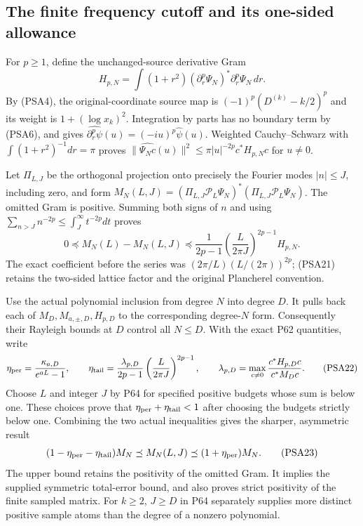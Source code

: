 \documentclass{article}
\begin{document}
\subsection{The finite frequency cutoff and its one-sided allowance}

For $p\ge1$, define the unchanged-source derivative Gram
\[
 H_{p,N}=\int(1+r^2)(\partial_r^p\Psi_N)^*
                            \partial_r^p\Psi_N\,dr.
 \tag{PSA20}
\]
By (PSA4), the original-coordinate source map is
$(-1)^p(D^{(k)}-k/2)^p$ and its weight is
$1+(\log x_k)^2$. Integration by parts has no boundary term by
(PSA6), and gives
$\widehat{\partial_r^p\psi}(u)=(-iu)^p\widehat\psi(u)$.
Weighted Cauchy--Schwarz with
$\int(1+r^2)^{-1}dr=\pi$ proves
$\|\widehat{\Psi_Nc}(u)\|^2\le\pi|u|^{-2p}c^*H_{p,N}c$
for $u\ne0$.

Let $\Pi_{L,J}$ be the orthogonal projection onto precisely the
Fourier modes $|n|\le J$, including zero, and form
$M_N(L,J)=(\Pi_{L,J}\mathcal P_L\Psi_N)^*
                (\Pi_{L,J}\mathcal P_L\Psi_N)$.
The omitted Gram is positive. Summing both signs of $n$ and using
$\sum_{n>J}n^{-2p}\le\int_J^\infty t^{-2p}dt$ proves
\[
 0\preceq M_N(L)-M_N(L,J)
 \preceq\frac1{2p-1}
             \left(\frac{L}{2\pi J}\right)^{2p-1}H_{p,N}.
 \tag{PSA21}
\]
The exact coefficient before the series was
$(2\pi/L)(L/(2\pi))^{2p}$; (PSA21) retains the two-sided lattice
factor and the original Plancherel convention.

Use the actual polynomial inclusion from degree $N$ into degree $D$.
It pulls back each of $M_D,M_{a,\pm,D},H_{p,D}$ to the corresponding
degree-$N$ form. Consequently their Rayleigh bounds at $D$ control all
$N\le D$. With the exact P62 quantities, write
\[
 \eta_{\rm per}=\frac{\kappa_{a,D}}{e^{aL}-1},\qquad
 \eta_{\rm tail}=\frac{\lambda_{p,D}}{2p-1}
          \left(\frac{L}{2\pi J}\right)^{2p-1},\qquad
 \lambda_{p,D}=\max_{c\ne0}\frac{c^*H_{p,D}c}{c^*M_Dc}.
 \tag{PSA22}
\]
Choose $L$ and integer $J$ by P64 for specified positive budgets
whose sum is below one. These choices prove that
$\eta_{\rm per}+\eta_{\rm tail}<1$ after choosing the budgets
strictly below one. Combining the two actual inequalities gives the
sharper, asymmetric result
\[
 (1-\eta_{\rm per}-\eta_{\rm tail})M_N
 \preceq M_N(L,J)\preceq(1+\eta_{\rm per})M_N.
 \tag{PSA23}
\]
The upper bound retains the positivity of the omitted Gram. It implies
the supplied symmetric total-error bound, and also proves strict
positivity of the finite sampled matrix. For $k\ge2$, $J\ge D$ in
P64 separately supplies more distinct positive sample atoms than the
degree of a nonzero polynomial.
\end{document}
